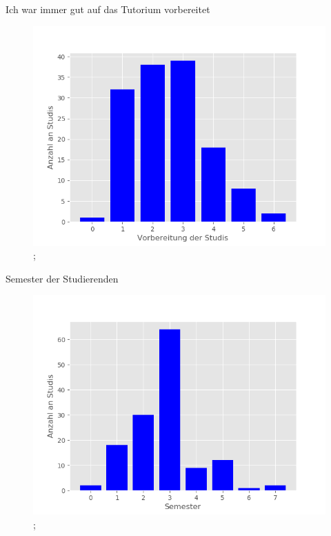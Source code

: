 \documentclass[10pt]{beamer}
\begin{document}
\begin{frame}[fragile]{Ich war immer gut auf das Tutorium vorbereitet} 
 \begin{figure}
 \includegraphics[width= 0.9\linewidth]{./PDFcreater/Plots/Ich+war+immer+gut+auf+das+Tutorium+vorbereitet.png};
 \end{figure}
 \end{frame}
\begin{frame}[fragile]{Semester der Studierenden} 
 \begin{figure}
 \includegraphics[width= 0.9\linewidth]{./PDFcreater/Plots/Semester+der+Studierenden.png};
 \end{figure}
 \end{frame}
\end{document}
